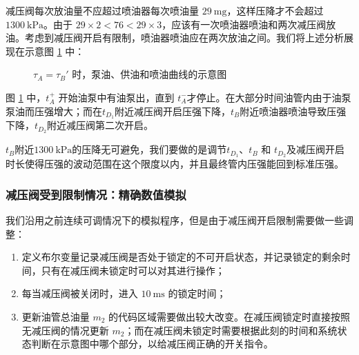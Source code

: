 \documentclass[withoutpreface,bwprint]{cumcmthesis}
\newcommand{\pre}{~\mathrm{kPa}}
\newcommand{\tim}{~\mathrm{ms}}
\newcommand{\mas}{~\mathrm{mg}}
\begin{document}
减压阀每次放油量不应超过喷油器每次喷油量 $29\mas$，这样压降才不会超过 $1300\pre$。由于 $29\times 2<76<29\times 3$，应该有一次喷油器喷油和两次减压阀放油。考虑到减压阀开启有限制，喷油器喷油应在两次放油之间。我们将上述分析展现在示意图 \ref{sketch32} 中：

\begin{figure}[!ht]
	\centering
	\caption{$\tau_A=\tau_B'$ 时，泵油、供油和喷油曲线的示意图}
	\label{sketch32}
\end{figure}
	
图 \ref{sketch32} 中，$t_A^+$ 开始油泵中有油泵出，直到 $t_A^-$才停止。在大部分时间油管内由于油泵泵油而压强增大；而在$t_{D_1}$附近减压阀开启压强下降，$t_B$附近喷油器喷油导致压强下降，$t_{D_2}$附近减压阀第二次开启。

$t_B$附近$1300\pre$的压降无可避免，我们要做的是调节$t_{D_1}$、$t_B$ 和 $t_{D_2}$及减压阀开启时长使得压强的波动范围在这个限度以内，并且最终管内压强能回到标准压强。

\subsubsection{减压阀受到限制情况：精确数值模拟}

我们沿用之前连续可调情况下的模拟程序，但是由于减压阀开启限制需要做一些调整：

\begin{enumerate}
	\item 定义布尔变量记录减压阀是否处于锁定的不可开启状态，并记录锁定的剩余时间，只有在减压阀未锁定时可以对其进行操作；
	\item 每当减压阀被关闭时，进入 $10\tim$ 的锁定时间；
	\item 更新油管总油量 $m_2$ 的代码区域需要做出较大改变。在减压阀锁定时直接按照无减压阀的情况更新 $m_2$；而在减压阀未锁定时需要根据此刻的时间和系统状态判断在示意图中哪个部分，以给减压阀正确的开关指令。
\end{enumerate}
\end{document}
